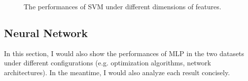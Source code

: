 \documentclass[12pt,a4paper]{article}
\theoremstyle{definition}
\begin{document}
\begin{figure}[H]
	\centering
	\caption{The performances of SVM under different dimensions of features.}
	\label{fig:svm-dim}
\end{figure}

\subsection{Neural Network}

In this section, I would also show the performances of MLP in the two datasets under different configurations (e.g. optimization algorithms, network architectures). In the meantime, I would also analyze each result concisely.
\end{document}
